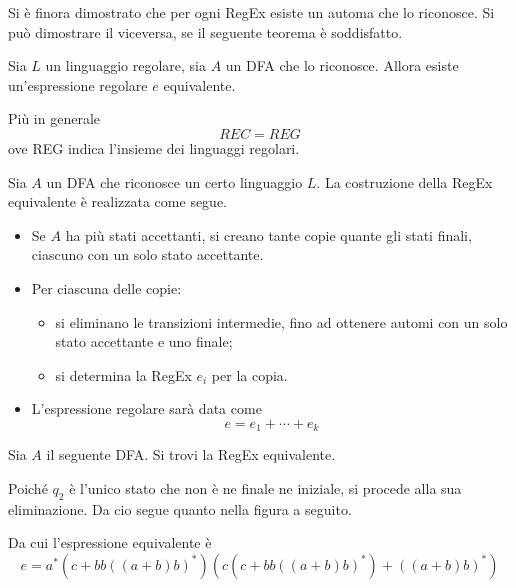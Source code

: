 \documentclass{subfiles}
\begin{document}
Si è finora dimostrato che per ogni RegEx esiste un automa che lo riconosce. Si può dimostrare il viceversa, se il seguente teorema è soddisfatto.
\begin{Theorem*}[di Kleene]
    Sia \(L\) un linguaggio regolare, sia \(A\) un DFA che lo riconosce. Allora esiste un'espressione regolare \(e\) equivalente.

    Più in generale
    \[
        REC = REG
    \]
    ove REG indica l'insieme dei linguaggi regolari.
\end{Theorem*}


\begin{Algorithm*}
    Sia \(A\) un DFA che riconosce un certo linguaggio \(L\). La costruzione della RegEx equivalente è realizzata come segue.
    \begin{itemize}
        \item Se \(A\) ha più stati accettanti, si creano tante copie quante gli stati finali, ciascuno con un solo stato accettante.
        \item Per ciascuna delle copie:
              \begin{itemize}
                  \item si eliminano le transizioni intermedie, fino ad ottenere automi con un solo stato accettante e uno finale;
                  \item si determina la RegEx \(e_{i}\) per la copia.
              \end{itemize}
        \item L'espressione regolare sarà data come
              \[
                  e = e_{1} + \cdots + e_{k}
              \]
    \end{itemize}
\end{Algorithm*}

\begin{Example*}
    Sia \(A\) il seguente DFA. Si trovi la RegEx equivalente.
    

    \begin{Solution*}
        Poiché \(q_{2}\) è l'unico stato che non è ne finale ne iniziale, si procede alla sua eliminazione.
        Da cio segue quanto nella figura a seguito.
        

        \noindent Da cui l'espressione equivalente è
        \[
            e = a^{*}(c + bb((a + b)b)^{*})(c(c + bb((a + b)b)^{*}) + ((a + b)b)^{*})
        \]
    \end{Solution*}
\end{Example*}
\end{document}
